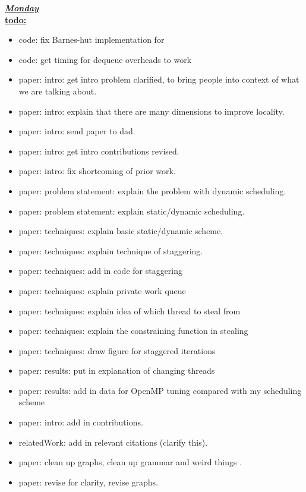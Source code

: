 \underline{\textbf{\textit{Monday}}}\\
\underline{\textbf{todo:}}
\begin{itemize}

\item code: fix Barnes-hut implementation for
\item code: get timing for dequeue overheads to work

\item paper: intro: get intro problem clarified, to bring people into context of what we are talking about.
\item paper: intro: explain that there are many dimensions to improve locality.
\item paper: intro: send paper to dad.
\item paper: intro: get intro contributions revised.
\item paper: intro: fix shortcoming of prior work.

\item paper: problem statement: explain the problem with dynamic scheduling.
\item paper: problem statement: explain static/dynamic scheduling.
\item paper: techniques: explain basic static/dynamic scheme.
\item paper: techniques: explain technique of staggering. 
\item paper: techniques: add in code for staggering
\item paper: techniques: explain private work queue
\item paper: techniques: explain idea of which thread to steal from
\item paper: techniques: explain the constraining function in stealing
\item paper: techniques: draw figure for staggered iterations 
\item paper: results: put in explanation of changing threads
\item paper: results: add in data for OpenMP tuning compared with my scheduling scheme
\item paper: intro: add in contributions.
\item relatedWork: add in relevant citations (clarify this).
\item paper: clean up graphs, clean up grammar and weird things .
\item paper: revise for clarity, revise graphs.
\end{itemize}

